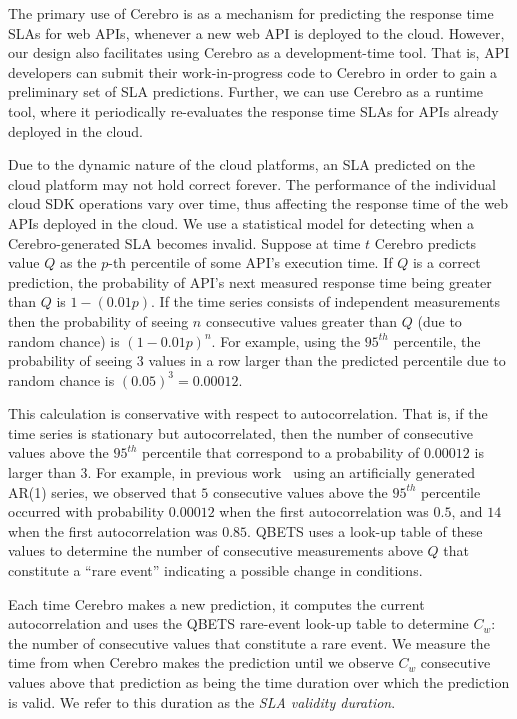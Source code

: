 The primary use of Cerebro is as a mechanism for predicting the response time SLAs for web APIs,
whenever a new web API is deployed to the cloud. However, our design also facilitates using
Cerebro as a development-time tool. That is, API developers can submit their work-in-progress
code to Cerebro in order to gain a preliminary set of SLA predictions. Further, we can use
Cerebro as a runtime tool, where it periodically re-evaluates the response time SLAs for 
APIs already deployed in the cloud.

Due to the dynamic nature of the cloud platforms, an SLA predicted on the cloud platform may not
hold correct forever. The performance of the individual cloud SDK operations vary over time, thus
affecting the response time of the web APIs deployed in the cloud. We use a
statistical model for detecting when a Cerebro-generated SLA becomes invalid. 
Suppose at time $t$ Cerebro predicts value $Q$ as the $p$-th percentile of
some API's execution time.  If $Q$ is a correct prediction,
the probability of API's next measured response time being greater than 
$Q$ is $1-(0.01p)$.  If the time series consists of independent
measurements then the probability of seeing $n$ consecutive values greater
than $Q$ (due to random chance) is $(1-0.01p)^n$. 
For example, using the $95^{th}$ percentile, the probability of seeing $3$
values in a row larger than the predicted percentile due to random chance
is $(0.05)^3 = 0.00012$.

This calculation is conservative with respect to autocorrelation. That is, if
the time series is stationary but autocorrelated, then the number of consecutive 
values above the $95^{th}$ percentile that correspond to a probability of
$0.00012$ is larger than $3$.  For example, in previous
work~\cite{Nurmi:2007:QQB:1791551.1791556}
using an artificially generated AR(1) series, 
we observed that $5$ consecutive values above the $95^{th}$ percentile
occurred with probability $0.00012$ when the first autocorrelation was $0.5$,
and $14$ when the first autocorrelation was $0.85$. QBETS uses a look-up
table of these values to determine the number of consecutive measurements above
$Q$ that constitute a ``rare event'' indicating a possible change in conditions.

Each time Cerebro makes a new prediction, it computes the current
autocorrelation and uses the QBETS rare-event look-up table to determine $C_{w}$:
the number of consecutive values that constitute a rare event.
We measure the time from when
Cerebro makes the prediction until we observe $C_{w}$ 
consecutive values above that prediction 
as being the time duration over which
the prediction is valid. We refer to this duration as the \textit{SLA validity duration}.  


